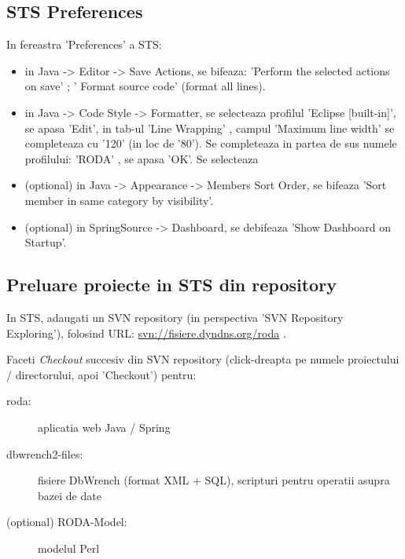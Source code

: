 \subsection{STS Preferences}
In fereastra 'Preferences' a STS:
\begin{itemize}
\item
in Java -> Editor -> Save Actions, se bifeaza: 'Perform the selected actions on save' ; ' Format source code' (format all lines).
\item
in Java -> Code Style -> Formatter, se selecteaza profilul 'Eclipse [built-in]', se apasa 'Edit', in tab-ul 'Line Wrapping' , campul 'Maximum line width' se completeaza cu '120' (in loc de '80').
Se completeaza in partea de sus numele profilului: 'RODA' , se apasa 'OK'. Se selecteaza
\item
(optional) in Java -> Appearance -> Members Sort Order, se bifeaza 'Sort member in same category by visibility'.
\item
(optional) in SpringSource -> Dashboard, se debifeaza 'Show Dashboard on Startup'.
\end{itemize}

\subsection{Preluare proiecte in STS din repository}
In STS, adaugati un SVN repository 
(in perspectiva 'SVN Repository Exploring'), 
folosind URL: \url{svn://fisiere.dyndns.org/roda} .

Faceti \emph{Checkout} succesiv din SVN repository 
(click-dreapta pe numele proiectului / directorului, apoi 'Checkout') 
pentru:
\begin{description}
\item [roda:] aplicatia web Java / Spring
\item [dbwrench2-files:] fisiere DbWrench (format XML + SQL), scripturi pentru operatii asupra bazei de date
\item [(optional) RODA-Model:] modelul Perl
\end{description}

\begin{comment}
In STS, se face upgrade la Subversion 1.7 (pt. working copy) pentru fiecare din proiectele de mai sus: 
in perspectiva 'Spring', 
in view-ul 'Package Explorer' sau in view-ul 'Navigator', 
click-dreapta pe numele proiectului respectiv,
si apoi in meniul aparut:
'Team' -> 'Upgrade' -> 'OK'. 
Poate aparea un mesaj de eroare/warning, care indica
faptul ca working-copy local este deja conform versiunii 1.7 a SVN.
\end{comment}

